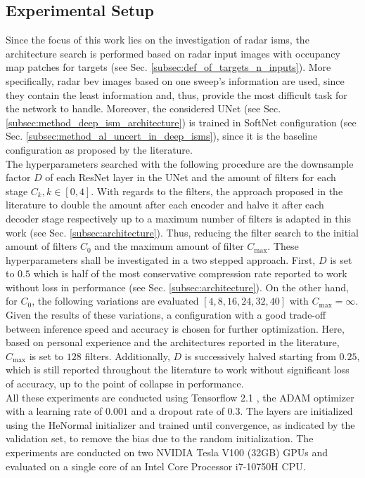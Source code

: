 \subsection{Experimental Setup}
\label{subsec:exp_setup_unet_arch}
Since the focus of this work lies on the investigation of radar \gls{ism}s, the architecture search is performed based on radar input images with occupancy map patches for targets (see Sec. \ref{subsec:def_of_targets_n_inputs}). More specifically, radar \gls{bev} images based on one sweep's information are used, since they contain the least information and, thus, provide the most difficult task for the network to handle. Moreover, the considered UNet (see Sec. \ref{subsec:method_deep_ism_architecture}) is trained in SoftNet configuration (see Sec. \ref{subsec:method_al_uncert_in_deep_isms}), since it is the baseline configuration as proposed by the literature.
\\
The hyperparameters searched with the following procedure are the downsample factor $D$ of each ResNet layer in the UNet and the amount of filters for each stage $C_k, k \in [0,4]$. With regards to the filters, the approach proposed in the literature to double the amount after each encoder and halve it after each decoder stage respectively up to a maximum number of filters is adapted in this work (see Sec. \ref{subsec:architecture}). Thus, reducing the filter search to the initial amount of filters $C_0$ and the maximum amount of filter $C_{\max}$. These hyperparameters shall be investigated in a two stepped approach. First, $D$ is set to $0.5$ which is half of the most conservative compression rate reported to work without loss in performance (see Sec. \ref{subsec:architecture}). On the other hand, for $C_0$, the following variations are evaluated $[4,8,16,24,32,40]$ with $C_{\max} = \infty$.\\
Given the results of these variations, a configuration with a good trade-off between inference speed and accuracy is chosen for further optimization. Here, based on personal experience and the architectures reported in the literature, $C_{\max}$ is set to $128$ filters. Additionally, $D$ is successively halved starting from $0.25$, which is still reported throughout the literature to work without significant loss of accuracy, up to the point of collapse in performance.
\\   
All these experiments are conducted using Tensorflow 2.1 \cite{abadi2016tensorflow}, the ADAM optimizer \cite{kingma2014adam} with a learning rate of $0.001$ and a dropout rate of $0.3$. The layers are initialized using the HeNormal initializer \cite{he2015delving} and trained until convergence, as indicated by the validation set, to remove the bias due to the random initialization. The experiments are conducted on two NVIDIA Tesla V100 (32GB) GPUs and evaluated on a single core of an Intel Core Processor i7-10750H CPU.
%
